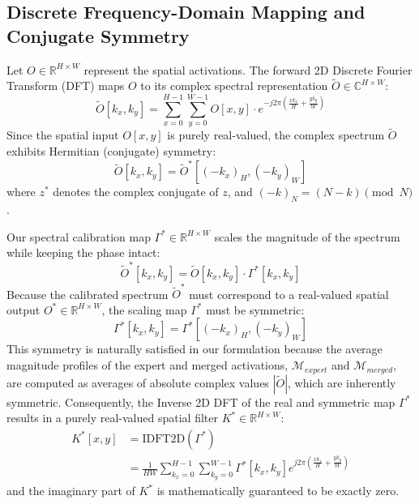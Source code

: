 \documentclass{article}
\theoremstyle{plain}
\theoremstyle{definition}
\theoremstyle{remark}
\begin{document}
\subsection{Discrete Frequency-Domain Mapping and Conjugate Symmetry}
Let $O \in \mathbb{R}^{H \times W}$ represent the spatial activations. The forward 2D Discrete Fourier Transform (DFT) maps $O$ to its complex spectral representation $\tilde{O} \in \mathbb{C}^{H \times W}$:
\begin{equation}
    \tilde{O}[k_x, k_y] = \sum_{x=0}^{H-1} \sum_{y=0}^{W-1} O[x, y] \cdot e^{-j 2 \pi \left( \frac{x k_x}{H} + \frac{y k_y}{W} \right)}
\end{equation}
Since the spatial input $O[x, y]$ is purely real-valued, the complex spectrum $\tilde{O}$ exhibits Hermitian (conjugate) symmetry:
\begin{equation}
    \tilde{O}[k_x, k_y] = \tilde{O}^*[(-k_x)_H, (-k_y)_W]
\end{equation}
where $z^*$ denotes the complex conjugate of $z$, and $(-k)_N = (N - k) \pmod N$.

Our spectral calibration map $\Gamma^* \in \mathbb{R}^{H \times W}$ scales the magnitude of the spectrum while keeping the phase intact:
\begin{equation}
    \tilde{O}^*[k_x, k_y] = \tilde{O}[k_x, k_y] \cdot \Gamma^*[k_x, k_y]
\end{equation}
Because the calibrated spectrum $\tilde{O}^*$ must correspond to a real-valued spatial output $O^* \in \mathbb{R}^{H \times W}$, the scaling map $\Gamma^*$ must be symmetric:
\begin{equation}
    \Gamma^*[k_x, k_y] = \Gamma^*[(-k_x)_H, (-k_y)_W]
\end{equation}
This symmetry is naturally satisfied in our formulation because the average magnitude profiles of the expert and merged activations, $\mathcal{M}_{expert}$ and $\mathcal{M}_{merged}$, are computed as averages of absolute complex values $|\tilde{O}|$, which are inherently symmetric. Consequently, the Inverse 2D DFT of the real and symmetric map $\Gamma^*$ results in a purely real-valued spatial filter $K^* \in \mathbb{R}^{H \times W}$:
\begin{align}
    K^*[x, y] &= \text{IDFT2D}(\Gamma^*) \\
    &= \frac{1}{H W} \sum_{k_x=0}^{H-1} \sum_{k_y=0}^{W-1} \Gamma^*[k_x, k_y] e^{j 2 \pi \left( \frac{x k_x}{H} + \frac{y k_y}{W} \right)}
\end{align}
and the imaginary part of $K^*$ is mathematically guaranteed to be exactly zero.
\end{document}

